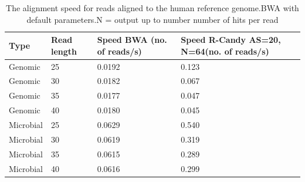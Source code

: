 \documentclass[11pt,a4paper]{report}
\begin{document}
\begin{table}[H]
  \begin{tabular}{ |  p{2cm} | p{2cm} | p{3cm} | p{3cm} | }
    \hline
  	\textbf{Type} & \textbf{Read length }&\textbf{Speed BWA \hspace{35pt}(no. of reads/s) } 	 
  	& \textbf{Speed R-Candy AS=20, N=64\hspace{35pt}(no. of reads/s)}\\ \hline
  	  
 	  Genomic    & 25  & 0.0192 &   0.123 \\ \hline
      Genomic    & 30  & 0.0182 &   0.067 \\ \hline
      Genomic    & 35  & 0.0177 &   0.047 \\ \hline
 	  Genomic	 & 40  & 0.0180 &   0.045 \\ \hline
 	  Microbial  & 25  & 0.0629 &   0.540 \\ \hline
      Microbial  & 30  & 0.0619 &   0.319 \\ \hline
 	  Microbial  & 35  & 0.0615 &   0.289 \\ \hline
 	  Microbial  & 40  & 0.0616 &   0.299 \\ \hline
 	  
   \end{tabular}
\caption{The alignment speed for reads aligned to the human reference genome.BWA with default parameters.N = output up to number number of hits per read }
\label{speed-RG}
\end{table}
\end{document}
